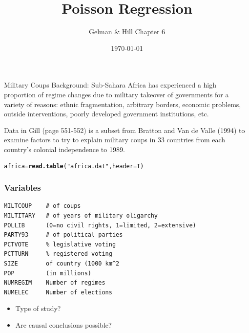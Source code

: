 \documentclass[handout]{beamer}\usepackage[]{graphicx}\usepackage[]{color}
\title{Poisson Regression}
\author{Gelman \&  Hill Chapter 6}
\date{\today}
\makeatletter
\newcommand{\hlstr}[1]{\textcolor[rgb]{0.192,0.494,0.8}{#1}}%
\newcommand{\hlstd}[1]{\textcolor[rgb]{0.345,0.345,0.345}{#1}}%
\newcommand{\hlkwb}[1]{\textcolor[rgb]{0.69,0.353,0.396}{#1}}%
\newcommand{\hlkwc}[1]{\textcolor[rgb]{0.333,0.667,0.333}{#1}}%
\newcommand{\hlkwd}[1]{\textcolor[rgb]{0.737,0.353,0.396}{\textbf{#1}}}%
\newenvironment{kframe}{%
 \def\at@end@of@kframe{}%
 \ifinner\ifhmode%
  \def\at@end@of@kframe{\end{minipage}}%
  \begin{minipage}{\columnwidth}%
 \fi\fi%
 \def\FrameCommand##1{\hskip\@totalleftmargin \hskip-\fboxsep
 \colorbox{shadecolor}{##1}\hskip-\fboxsep
     \hskip-\linewidth \hskip-\@totalleftmargin \hskip\columnwidth}%
 \MakeFramed {\advance\hsize-\width
   \@totalleftmargin\z@ \linewidth\hsize
   \@setminipage}}%
 {\par\unskip\endMakeFramed%
 \at@end@of@kframe}
\newenvironment{knitrout}{}{} %
\makeatother
\begin{document}
\maketitle
\begin{frame}{Military Coups}
Background: Sub-Sahara Africa has experienced a high proportion of
regime changes due to military takeover of governments for a variety
of reasons: ethnic fragmentation, arbitrary borders, economic problems,
outside interventions, poorly developed government institutions, etc.


\vspace{.5in}
Data in Gill (page 551-552) is a subset from Bratton and Van de Valle
(1994) to examine factors to try to explain military coups in 33
countries from each country's colonial independence to 1989.

\begin{knitrout}
\color{fgcolor}\begin{kframe}
\begin{alltt}
\hlstd{africa} \hlkwb{=}  \hlkwd{read.table}\hlstd{(}\hlstr{"africa.dat"}\hlstd{,} \hlkwc{header} \hlstd{= T)}
\end{alltt}
\end{kframe}
\end{knitrout}
\end{frame}


\begin{frame}[fragile]\frametitle{Variables}
\begin{verbatim}
MILTCOUP    # of coups
MILTITARY   # of years of military oligarchy
POLLIB      (0=no civil rights, 1=limited, 2=extensive)
PARTY93     # of political parties
PCTVOTE     % legislative voting
PCTTURN     % registered voting
SIZE        of country (1000 km^2
POP         (in millions)
NUMREGIM    Number of regimes
NUMELEC     Number of elections
\end{verbatim}

  \begin{itemize}
  \item Type of study? \pause
  \item Are causal conclusions possible?  \pause

  \end{itemize}


\end{frame}
\end{document}

